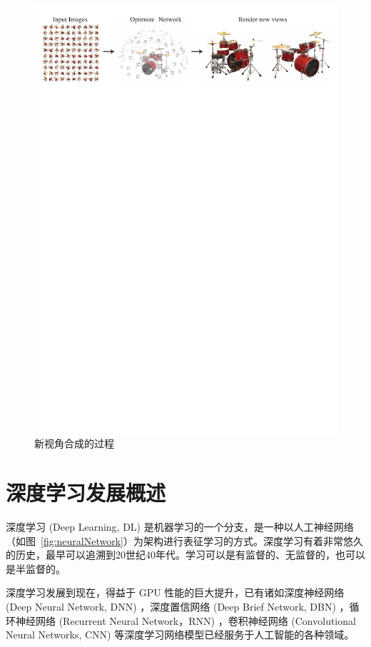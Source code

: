 \begin{figure}[t]
  \centering
  \includegraphics[width=0.95\linewidth]{figures/drums.pdf}
  \caption{新视角合成的过程\cite{mildenhall2020nerf}}
  \label{fig:novelviewsynthesis}
\end{figure}

\section{深度学习发展概述}
深度学习 (Deep Learning, DL) 是机器学习的一个分支，是一种以人工神经网络（如图~\ref{fig:neuralNetwork}）为架构进行表征学习的方式。深度学习有着非常悠久的历史，最早可以追溯到20世纪40年代\cite{goodfellow2016deep}。学习可以是有监督的、无监督的，也可以是半监督的。

深度学习发展到现在，得益于 GPU 性能的巨大提升，已有诸如深度神经网络 (Deep Neural Network, DNN) ，深度置信网络\cite{hinton2009deep} (Deep Brief Network, DBN) ，循环神经网络\cite{rumelhart1986learning} (Recurrent Neural Network，RNN) ，卷积神经网络\cite{lecun1995convolutional} (Convolutional Neural Networks, CNN) 等深度学习网络模型已经服务于人工智能的各种领域。

